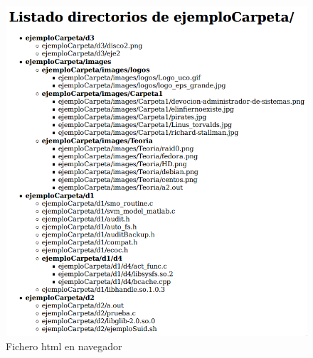 \documentclass{article}
\begin{document}
\begin{figure}[ht]
	\centering
	\includegraphics[width=1\textwidth]{ejercicio6-2.png}
	\caption{Fichero html en navegador}
\end{figure}
\end{document}
